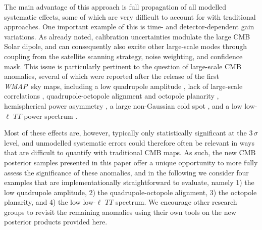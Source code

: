 \documentclass[twocolumn]{aa}
\def\WMAP{\textit{WMAP}}
\begin{document}
The main advantage of this approach is full propagation of all
modelled systematic effects, some of which are very difficult to
account for with traditional approaches. One important example of this
is time- and detector-dependent gain variations. As already noted,
calibration uncertainties modulate the large CMB Solar dipole, and can
consequently also excite other large-scale modes through coupling from
the satellite scanning strategy, noise weighting, and confidence
mask. This issue is particularly pertinent to the question of
large-scale CMB anomalies, several of which were reported after the
release of the first \WMAP\ sky maps, including a low quadrupole
amplitude \citep{bennett:1992}, lack of large-scale correlations
\citep{spergel:2003}, quadrupole-octopole alignment and octopole
planarity \citep{dOC2004}, hemispherical power asymmetry
\citep{asymmetry2004}, a large non-Gaussian cold spot
\citep{vielva:2004}, and a low low-$\ell$ $TT$ power spectrum
\citep{planck2013-p08}.

Most of these effects are, however, typically only statistically
significant at the $3\,\sigma$ level, and unmodelled systematic errors
could therefore often be relevant in ways that are difficult to
quantify with traditional CMB maps. As such, the new CMB posterior
samples presented in this paper offer a unique opportunity to more
fully assess the significance of these anomalies, and in the following
we consider four examples that are implementationally straightforward
to evaluate, namely 1) the low quadrupole amplitude, 2) the
quadrupole-octopole alignment, 3) the octopole planarity, and 4) the
low low-$\ell$ $TT$ spectrum. We encourage other research groups to
revisit the remaining anomalies using their own tools on the new
posterior products provided here.
\end{document}
